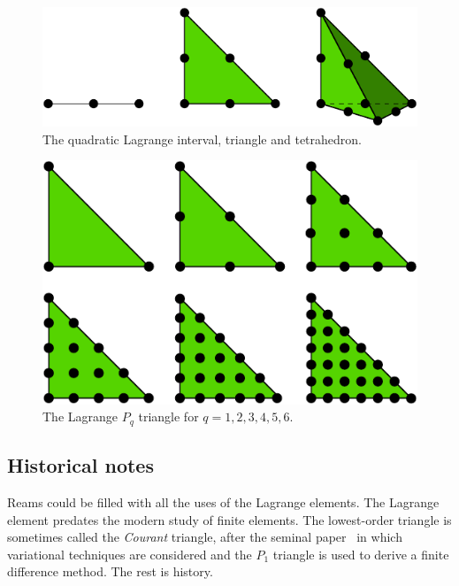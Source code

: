 \begin{figure}[h]
  \begin{center}
    \includegraphics[width=15cm]{chapters/kirby-6/pdf/P2-1d2d3d.pdf}
    \caption{The quadratic Lagrange interval, triangle and tetrahedron.}
  \end{center}
\end{figure}

\begin{figure}[h]
  \begin{center}
    \includegraphics[width=15cm]{chapters/kirby-6/pdf/P1-6.pdf}
    \caption{The Lagrange $P_q$ triangle for $q = 1,2,3,4,5,6$.}
  \end{center}
\end{figure}

\subsection{Historical notes}

Reams could be filled with all the uses of the Lagrange elements.  The
Lagrange element predates the modern study of finite elements.  The
lowest-order triangle is sometimes called the \emph{Courant} triangle,
after the seminal paper~\cite{Courant1943} in which variational
techniques are considered and the \( P_1 \) triangle is used to derive
a finite difference method. The rest is history.

